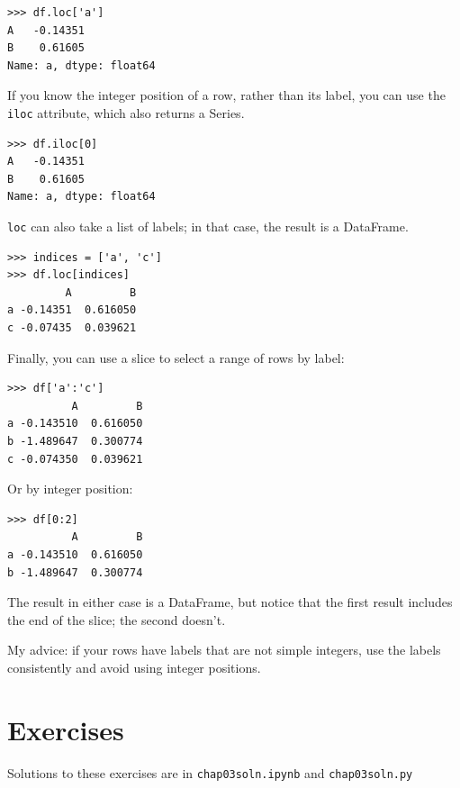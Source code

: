 \documentclass[12pt]{book}
\begin{document}
\begin{verbatim}
>>> df.loc['a']
A   -0.14351
B    0.61605
Name: a, dtype: float64
\end{verbatim}

If you know the integer position of a row, rather than its label, you
can use the \verb"iloc" attribute, which also returns a Series.

\begin{verbatim}
>>> df.iloc[0]
A   -0.14351
B    0.61605
Name: a, dtype: float64
\end{verbatim}

\verb"loc" can also take a list of labels; in that case,
the result is a DataFrame.

\begin{verbatim}
>>> indices = ['a', 'c']
>>> df.loc[indices]
         A         B
a -0.14351  0.616050
c -0.07435  0.039621
\end{verbatim}

Finally, you can use a slice to select a range of rows by label:

\begin{verbatim}
>>> df['a':'c']
          A         B
a -0.143510  0.616050
b -1.489647  0.300774
c -0.074350  0.039621
\end{verbatim}

Or by integer position:

\begin{verbatim}
>>> df[0:2]
          A         B
a -0.143510  0.616050
b -1.489647  0.300774
\end{verbatim}

The result in either case is a DataFrame, but notice that the first
result includes the end of the slice; the second doesn't.

My advice: if your rows have labels that are not simple integers, use
the labels consistently and avoid using integer positions.



\section{Exercises}

Solutions to these exercises are in \verb"chap03soln.ipynb"
and \verb"chap03soln.py"
\end{document}
